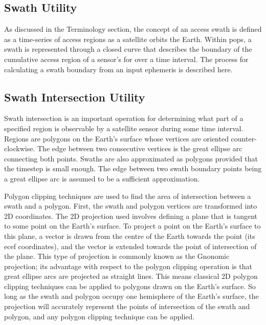 \subsection{Swath Utility} 

As discussed in the Terminology section, the concept of an access swath is
defined as a time-series of access regions as a satellite orbits the Earth.
Within \gls{pops}, a swath is represented through a closed curve that describes
the boundary of the cumulative access region of a sensor’s \gls{for} over a
time interval. The process for calculating a swath boundary from an input
ephemeris is described here. 



\subsection{Swath Intersection Utility}

Swath intersection is an important operation for determining what part of a
specified region is observable by a satellite sensor during some time interval.
Regions are polygons on the Earth’s surface whose vertices are oriented
counter-clockwise. The edge between two consecutive vertices is the great
ellipse arc connecting both points. Swaths are also approximated as polygons
provided that the timestep is small enough. The edge between two swath boundary
points being a great ellipse arc is assumed to be a sufficient approximation. 

Polygon clipping techniques are used to find the area of intersection between a
swath and a polygon. First, the swath and polygon vertices are transformed into
2D coordinates. The 2D projection used involves defining a plane that is
tangent to some point on the Earth’s surface. To project a point on the Earth’s
surface to this plane, a vector is drawn from the centre of the Earth towards
the point (its \gls{ecef} coordinates), and the vector is extended towards the
point of intersection of the plane. This type of projection is commonly known
as the Gnonomic projection; its advantage with respect to the polygon clipping
operation is that great ellipse arcs are projected as straight lines. This
means classical 2D polygon clipping techniques can be applied to polygons drawn
on the Earth’s surface. So long as the swath and polygon occupy one hemisphere
of the Earth’s surface, the projection will accurately represent the points of
intersection of the swath and polygon, and any polygon clipping technique can
be applied. 




